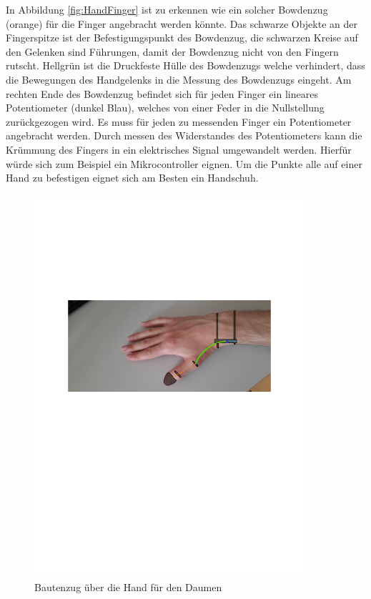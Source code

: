 \documentclass[a4paper,12pt,final]{article} %
\numberwithin{equation}{section} %
\numberwithin{figure}{section} %
\numberwithin{table}{section} %
\begin{document}
In Abbildung \ref{fig:HandFinger} ist zu erkennen wie ein solcher Bowdenzug (orange) für die Finger angebracht werden könnte.
Das schwarze Objekte an der Fingerspitze ist der Befestigungspunkt des Bowdenzug, die schwarzen Kreise auf den Gelenken sind Führungen, damit der Bowdenzug nicht von den Fingern rutscht.
Hellgrün ist die Druckfeste Hülle des Bowdenzugs welche verhindert, dass die Bewegungen des Handgelenks in die Messung des Bowdenzugs eingeht.
Am rechten Ende des Bowdenzug befindet sich für jeden Finger ein lineares Potentiometer (dunkel Blau), welches von einer Feder in die Nullstellung zurückgezogen wird.
Es muss für jeden zu messenden Finger ein Potentiometer angebracht werden. Durch messen des Widerstandes des Potentiometers kann die Krümmung des Fingers in ein elektrisches Signal umgewandelt werden. Hierfür würde sich zum Beispiel ein Mikrocontroller eignen. 
Um die Punkte alle auf einer Hand zu befestigen eignet sich am Besten ein Handschuh. 
\begin{figure}[H]
	\begin{center}
		\includegraphics[width=10cm]{Bilder/HandPhoto2.pdf}
		\caption{Bautenzug über die Hand für den Daumen}
		\label{fig:HandDaumen}
	\end{center}
\end{figure}
\end{document}
